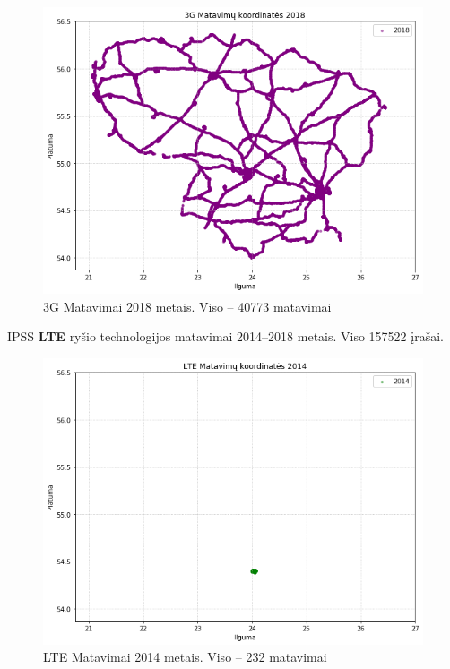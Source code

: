 \documentclass{VUMIFPSbakalaurinis}
\begin{document}
\begin{figure}[H]
	\centering
	\includegraphics[scale=0.5]{img/3G-5}
	\caption{3G Matavimai 2018 metais. Viso – 40773 matavimai}
	\label{img:3G-5}
\end{figure}
IPSS \textbf{LTE} ryšio technologijos matavimai 2014–2018 metais. Viso 157522 įrašai.
\begin{figure}[H]
	\centering
	\includegraphics[scale=0.5]{img/LTE-1}
	\caption{LTE Matavimai 2014 metais. Viso – 232 matavimai}
	\label{img:LTE-1}
\end{figure}
\end{document}
